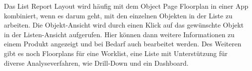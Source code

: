 Das List Report Layout wird häufig mit dem Object Page Floorplan in einer App kombiniert, wenn es darum geht, mit den einzelnen Objekten in der Liste zu arbeiten. Die Objekt-Ansicht wird durch einen Klick auf das gewünschte Objekt in der Listen-Ansicht aufgerufen. Hier können dann weitere Informationen zu \zB einem Produkt angezeigt und bei Bedarf auch bearbeitet werden. Des Weiteren gibt es noch Floorplans für eine Worklist, eine Liste mit Unterstützung für diverse Analyseverfahren, wie \zB Drill-Down und ein Dashboard.